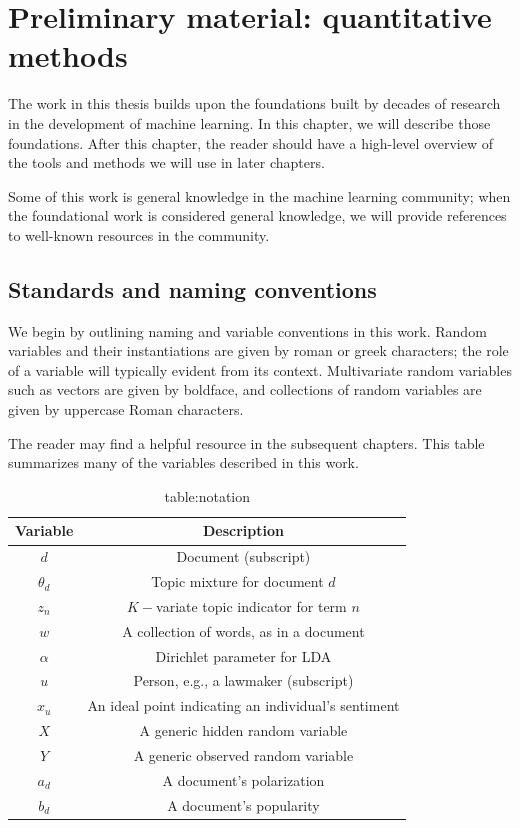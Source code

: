 \chapter{Preliminary material: quantitative methods}
The work in this thesis builds upon the foundations built by decades
of research in the development of machine learning.  In this chapter,
we will describe those foundations. After this chapter, the reader
should have a high-level overview of the tools and methods we will use
in later chapters.

Some of this work is general knowledge in the machine learning
community; when the foundational work is considered general knowledge,
we will provide references to well-known resources in the community.

\section{Standards and naming conventions}
We begin by outlining naming and variable conventions in this work.
Random variables and their instantiations are given by roman or greek
characters; the role of a variable will typically evident from its
context.  Multivariate random variables such as vectors are given by
boldface, and collections of random variables are given by uppercase
Roman characters.

The reader may find  a helpful resource in the
subsequent chapters.  This table summarizes many of the variables
described in this work.
\begin{table}
    \caption{table:notation}
    \begin{center}
      \begin{tabular}{|c|c|}
      \hline
      \textbf{Variable} & \textbf{Description} \\
      \hline
      $d$ & Document (subscript) \\
      $\theta_d$ & Topic mixture for document $d$ \\
      $z_n$ & $K-$variate topic indicator for term $n$ \\
      $w$ & A collection of words, as in a document \\
      $\alpha$ & Dirichlet parameter for LDA \\
      $u$ & Person, e.g., a lawmaker (subscript) \\
      $x_u$ & An ideal point indicating an individual's sentiment \\
      $X$ & A generic hidden random variable \\
      $Y$ & A generic observed random variable \\
      $a_d$ & A document's polarization \\
      $b_d$ & A document's popularity \\
      \hline
    \end{tabular}
    \end{center}
  \end{table}

